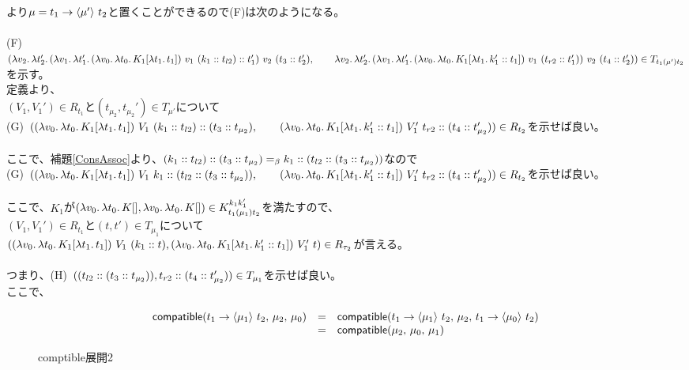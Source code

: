 より$\mu=\Trail{t_1}{t_2}{\mu'}$と置くことができるので(F)は次のようになる。\\
\\
(F)\ $(\Lam{v_2}{\Lam{t_2'}{\LamP{v_1}{\Lam{t_1'}{\LamP{v_0}{\Lam{t_0}{K_1[\Lam{t_1}{t_1}]}}}\ v_1\ \Cons{\ConsP{k_1}{t_{l2}}}{t_1'}}}\ v_2\ \ConsP{t_3}{t_2'}},\\
\qquad \Lam{v_2}{\Lam{t_2'}{\LamP{v_1}{\Lam{t_1'}{\LamP{v_0}{\Lam{t_0}{K_1[\Lam{t_1}{\Cons{k_1'}{t_1}}]}}}\ v_1\ \ConsP{t_{r2}}{t_1'}}}\ v_2\ \ConsP{t_4}{t_2'}})\in T_{t_1(\mu')t_2}$を示す。\\
定義より、\\
$(V_1,V_1')\in R_{t_1}$と$(t_{\mu_2},t_{\mu_2}')\in T_{\mu'}$について\\
(G)\ $(\LamP{v_0}{\Lam{t_0}{K_1[\Lam{t_1}{t_1}]}}\ V_1\ \Cons{\ConsP{k_1}{t_{l2}}}{\ConsP{t_3}{t_{\mu_2}}},\\
\qquad \LamP{v_0}{\Lam{t_0}{K_1[\Lam{t_1}{\Cons{k_1'}{t_1}}]}}\ V_1'\ \Cons{t_{r2}}{\ConsP{t_4}{t_{\mu_2}'}})\in R_{t_2}$を示せば良い。\\
\\
ここで、補題\ref{ConsAssoc}より、$\Cons{\ConsP{k_1}{t_{l2}}}{\ConsP{t_3}{t_{\mu_2}}} =_{\beta} \Cons{k_1}{\ConsP{t_{l2}}{\ConsP{t_3}{t_{\mu_2}}}}$なので\\
(G)\ $(\LamP{v_0}{\Lam{t_0}{K_1[\Lam{t_1}{t_1}]}}\ V_1\ \Cons{k_1}{\ConsP{t_{l2}}{\ConsP{t_3}{t_{\mu_2}}}},\\
\qquad \LamP{v_0}{\Lam{t_0}{K_1[\Lam{t_1}{\Cons{k_1'}{t_1}}]}}\ V_1'\ \Cons{t_{r2}}{\ConsP{t_4}{t_{\mu_2}'}})\in R_{t_2}$を示せば良い。\\
\\
ここで、$K_1$が$(\Lam{v_0}{\Lam{t_0}{K[]}}, \Lam{v_0}{\Lam{t_0}{K[]}})\in K^{k_1k_1'}_{t_1 (\mu_1) t_2}$を満たすので、\\
$(V_1,V_1')\in R_{t_1}$と$(t,t')\in T_{\mu_1}$について\\
$(\LamP{v_0}{\Lam{t_0}{K_1[\Lam{t_1}{t_1}]}}\ V_1\ \ConsP{k_1}{t}, \LamP{v_0}{\Lam{t_0}{K_1[\Lam{t_1}{\Cons{k_1'}{t_1}}]}}\ V_1'\ t)
\in R_{\tau_2}$が言える。\\
\\
つまり、(H)\ $(\ConsP{t_{l2}}{\ConsP{t_3}{t_{\mu_2}}},\Cons{t_{r2}}{\ConsP{t_4}{t_{\mu_2}'}})\in T_{\mu_1}$を示せば良い。
\\
ここで、\\
\begin{figure}[h]
\[
\begin{array}{lcl}
  \Compatible{\Trail{t_1}{t_2}{\mu_1}}{\mu_2}{\mu_0} &=& \Compatible{\Trail{t_1}{t_2}{\mu_1}}{\mu_2}{\Trail{t_1}{t_2}{\mu_0}}\\
  &=& \Compatible{\mu_2}{\mu_0}{\mu_1}
\end{array}
\]
\caption{\textsf{comptible}展開2}
\label{Compatible2}
\end{figure}\\
